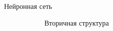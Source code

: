 \documentclass{beamer}
\begin{document}
\begin{frame}{Нейронная сеть}
\begin{figure}[h]
\begin{subfigure}{.33\textwidth}
\begin{overprint}
        \end{overprint}
        \caption{Вторичная структура}
    \end{subfigure}%
    \begin{subfigure}{.33\textwidth}
          \centering
          \begin{overprint}

\end{overprint}
\end{subfigure}
\end{figure}
\end{frame}
\end{document}

